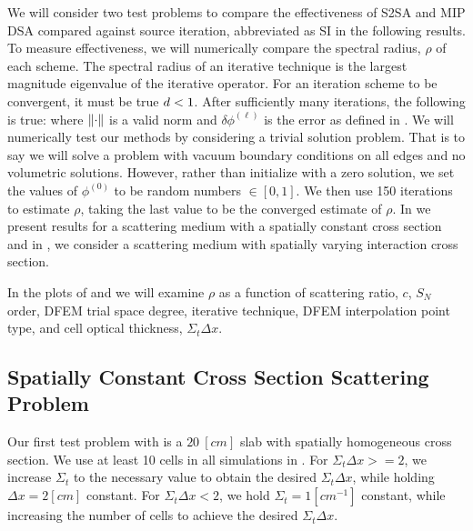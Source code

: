 We will consider two test problems to compare the effectiveness of S2SA and MIP DSA compared against source iteration, abbreviated as SI in the following results.
To measure effectiveness, we will  numerically compare the spectral radius, $\rho$ of each scheme.
The spectral radius of an iterative technique is the largest magnitude eigenvalue of the iterative operator.
For an iteration scheme to be convergent, it must be true $ d < 1$.
After sufficiently many iterations, the following is true:
\benum
{} \leq \rho {} \pec
\eenum
where $\left\lVert \cdot \right\rVert$ is a valid norm and $\delta \phi^{(\ell)}$ is the error as defined in .
We will numerically test our methods by considering a trivial solution problem.  
That is to say we will solve a problem with vacuum boundary conditions on all edges and no volumetric solutions.  
However, rather than initialize with a zero solution, we set the values of $\phi^{(0)}$ to be random numbers $\in[0,1]$.
We then use 150 iterations to estimate $\rho$, taking the last value to be the converged estimate of $\rho$.
In  we present results for a scattering medium with a spatially constant cross section and in , we consider a scattering medium with spatially varying interaction cross section.

In the plots of  and  we will examine $\rho$ as a function of scattering ratio, $c$, $S_N$ order, DFEM trial space degree, iterative technique, DFEM interpolation point type, and cell optical thickness, $\Sigma_t \Delta x$.

\subsection{Spatially Constant Cross Section Scattering Problem}
\label{sec:chap4_constant_xs}

Our first test problem with is a $20~[cm]$ slab with spatially homogeneous cross section.  
We use at least 10 cells in all simulations in .
For $\Sigma_t \Delta x >= 2$, we increase $\Sigma_t$ to the necessary value to obtain the desired $\Sigma_t \Delta x$, while holding $\Delta x = 2[cm]$ constant.
For $\Sigma_t \Delta x < 2$, we hold $\Sigma_t = 1[cm^{-1}]$ constant, while increasing the number of cells to achieve the desired $\Sigma_t \Delta x$.

